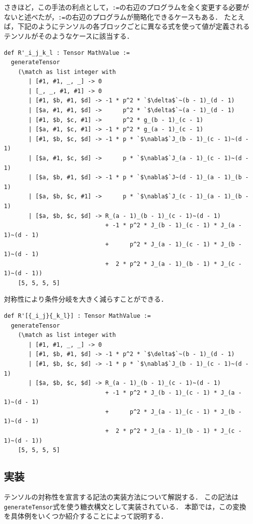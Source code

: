 さきほど，この手法の利点として，\lstinline{:=}の右辺のプログラムを全く変更する必要がないと述べたが，\lstinline{:=}の右辺のプログラムが簡略化できるケースもある．
たとえば，下記のようにテンソルの各ブロックごとに異なる式を使って値が定義されるテンソルがそのようなケースに該当する．
\begin{lstlisting}[language=egison,numbers=none]
def R'_i_j_k_l : Tensor MathValue :=
  generateTensor
    (\match as list integer with
       | [#1, #1, _, _] -> 0
       | [_, _, #1, #1] -> 0
       | [#1, $b, #1, $d] -> -1 * p^2 * `$\delta$`~(b - 1)_(d - 1)
       | [$a, #1, #1, $d] ->      p^2 * `$\delta$`~(a - 1)_(d - 1)
       | [#1, $b, $c, #1] ->      p^2 * g_(b - 1)_(c - 1)
       | [$a, #1, $c, #1] -> -1 * p^2 * g_(a - 1)_(c - 1)
       | [#1, $b, $c, $d] -> -1 * p * `$\nabla$`J_(b - 1)_(c - 1)~(d - 1)
       | [$a, #1, $c, $d] ->      p * `$\nabla$`J_(a - 1)_(c - 1)~(d - 1)
       | [$a, $b, #1, $d] -> -1 * p * `$\nabla$`J~(d - 1)_(a - 1)_(b - 1)
       | [$a, $b, $c, #1] ->      p * `$\nabla$`J_(c - 1)_(a - 1)_(b - 1)
       | [$a, $b, $c, $d] -> R_(a - 1)_(b - 1)_(c - 1)~(d - 1)
                             + -1 * p^2 * J_(b - 1)_(c - 1) * J_(a - 1)~(d - 1)
                             +      p^2 * J_(a - 1)_(c - 1) * J_(b - 1)~(d - 1)
                             +  2 * p^2 * J_(a - 1)_(b - 1) * J_(c - 1)~(d - 1))
    [5, 5, 5, 5]
\end{lstlisting}
対称性により条件分岐を大きく減らすことができる．
\begin{lstlisting}[language=egison,numbers=none]
def R'[{_i_j}{_k_l}] : Tensor MathValue :=
  generateTensor
    (\match as list integer with
       | [#1, #1, _, _] -> 0
       | [#1, $b, #1, $d] -> -1 * p^2 * `$\delta$`~(b - 1)_(d - 1)
       | [#1, $b, $c, $d] -> -1 * p * `$\nabla$`J_(b - 1)_(c - 1)~(d - 1)
       | [$a, $b, $c, $d] -> R_(a - 1)_(b - 1)_(c - 1)~(d - 1)
                             + -1 * p^2 * J_(b - 1)_(c - 1) * J_(a - 1)~(d - 1)
                             +      p^2 * J_(a - 1)_(c - 1) * J_(b - 1)~(d - 1)
                             +  2 * p^2 * J_(a - 1)_(b - 1) * J_(c - 1)~(d - 1))
    [5, 5, 5, 5]
\end{lstlisting}


\subsection{実装}

テンソルの対称性を宣言する記法の実装方法について解説する．
この記法は\lstinline{generateTensor}式を使う糖衣構文として実装されている．
本節では，この変換を具体例をいくつか紹介することによって説明する．


